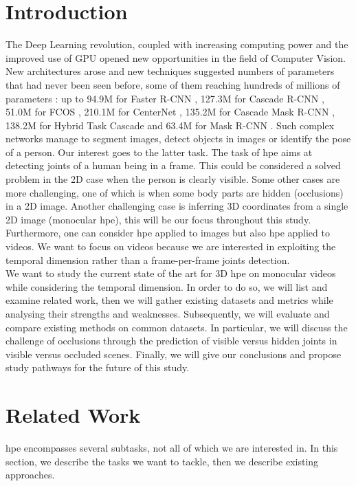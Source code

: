 \documentclass[runningheads]{llncs}
\begin{document}
\section{Introduction}
\label{section: introduction}
The Deep Learning revolution, coupled with increasing computing power and the improved use of GPU opened new opportunities in the field of Computer Vision. New architectures arose and new techniques suggested numbers of parameters that had never been seen before, some of them reaching hundreds of millions of parameters \cite{hrnet}: up to 94.9M for Faster R-CNN \cite{R-CNN}, 127.3M for Cascade R-CNN \cite{Cascade R-CNN}, 51.0M for FCOS \cite{FCOS}, 210.1M for CenterNet \cite{CenterNet}, 135.2M for Cascade Mask R-CNN \cite{Cascade R-CNN}, 138.2M for Hybrid Task Cascade \cite{Hybrid Task Cascade} and 63.4M for Mask R-CNN \cite{R-CNN}. Such complex networks manage to segment images, detect objects in images or identify the pose of a person. Our interest goes to the latter task. The task of \ac{hpe} aims at detecting joints of a human being in a frame. This could be considered a solved problem in the 2D case when the person is clearly visible. Some other cases are more challenging, one of which is when some body parts are hidden (occlusions) in a 2D image. Another challenging case is inferring 3D coordinates from a single 2D image (monocular \ac{hpe}), this will be our focus throughout this study. \\
Furthermore, one can consider \ac{hpe} applied to images but also \ac{hpe} applied to videos. We want to focus on videos because we are interested in exploiting the temporal dimension rather than a frame-per-frame joints detection. \\
We want to study the current state of the art for 3D \ac{hpe} on monocular videos while considering the temporal dimension. In order to do so, we will list and examine related work, then we will gather existing datasets and metrics while analysing their strengths and weaknesses. Subsequently, we will evaluate and compare existing methods on common datasets. In particular, we will discuss the challenge of occlusions through the prediction of visible versus hidden joints in visible versus occluded scenes. Finally, we will give our conclusions and propose study pathways for the future of this study.

\section{Related Work}
\ac{hpe} encompasses several subtasks, not all of which we are interested in. In this section, we describe the tasks we want to tackle, then we describe existing approaches.
\end{document}
